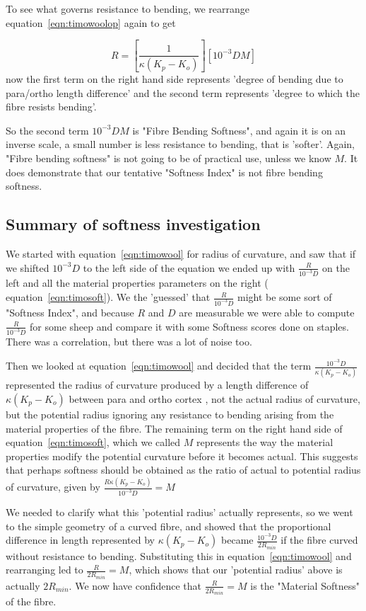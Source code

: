 \documentclass[titlepage]{article}  %
\begin{document}
To see what governs resistance to bending, we rearrange equation~\ref{eqn:timowoolop} again to get

\begin{equation}
\label{eqn:timowoolbend}
R = \left[ \frac{1}{\kappa (K_{p} - K_{o})} \right] \left[ 10^{-3}D M \right]
\end{equation}
now the first term on the right hand side represents 'degree of bending due to para/ortho length difference' and the second term represents 'degree to which the fibre resists bending'.

So the second term $10^{-3}D M$ is "Fibre Bending Softness", and again it is on an inverse scale, a small number is less resistance to bending, that is 'softer'. Again, "Fibre bending softness" is not going to be of practical use, unless we know $M$. It does demonstrate that our tentative "Softness Index" is not fibre bending softness.


\subsection{Summary of softness investigation}
We started with  equation~\ref{eqn:timowool} for radius of curvature, and saw that if we shifted $10^{-3}D$ to the left side of the equation we ended up with $\frac{R}{10^{-3}D}$ on the left and all the material properties parameters on the right ( equation~\ref{eqn:timosoft}). We the 'guessed' that $\frac{R}{10^{-3}D}$ might be some sort of "Softness Index", and because $R$ and $D$ are measurable we were able to compute $\frac{R}{10^{-3}D}$ for some sheep and compare it with some Softness scores done on staples. There was a correlation, but there was a lot of noise too.

Then we looked at equation~\ref{eqn:timowool} and decided that the term $\frac{10^{-3}D}{\kappa(K_{p} - K_{o})}$ represented the radius of curvature produced by a length difference of $\kappa(K_{p} - K_{o})$ between para and ortho cortex , not the actual radius of curvature, but the potential radius ignoring any resistance to bending arising from the material properties of the fibre. The remaining term on the right hand side of equation~\ref{eqn:timosoft}, which we called $M$ represents the way the material properties modify the potential curvature before it becomes actual. This suggests that perhaps softness should be obtained as the ratio of actual to potential radius of curvature, given by $\frac{R \kappa(K_{p} - K_{o})}{10^{-3}D} = M$

We needed to clarify what this 'potential radius' actually represents, so we went to the simple geometry of a curved fibre,  and showed that the proportional difference in length represented by $\kappa(K_{p} - K_{o})$ became $\frac{10^{-3}D}{2 R_{min}}$ if the fibre curved without resistance to bending. Substituting this in equation~\ref{eqn:timowool}  and rearranging led to $\frac{R}{2 R_{min}} = M$, which shows that our 'potential radius' above is actually $2 R_{min}$. We now have confidence that $\frac{R}{2 R_{min}} = M$  is the "Material Softness" of the fibre.
\end{document}
